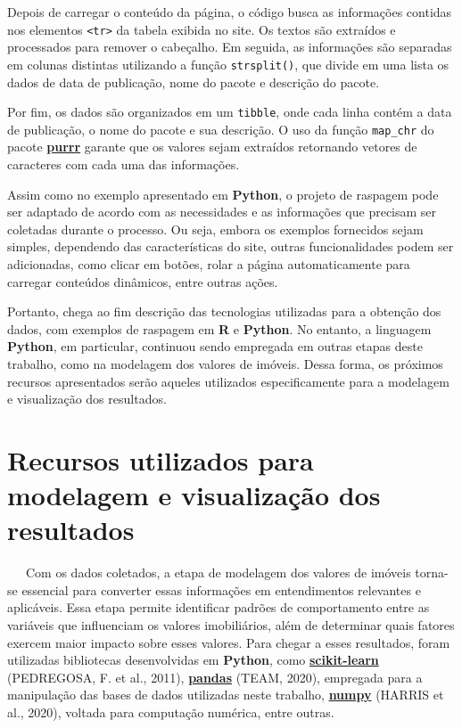 \documentclass[
  12pt,
  a4paper,
]{scrreprt}
\begin{document}
\vspace{12pt}

Depois de carregar o conteúdo da página, o código busca as informações
contidas nos elementos \texttt{\textless{}tr\textgreater{}} da tabela
exibida no site. Os textos são extraídos e processados para remover o
cabeçalho. Em seguida, as informações são separadas em colunas distintas
utilizando a função \texttt{strsplit()}, que divide em uma lista os
dados de data de publicação, nome do pacote e descrição do pacote.

\vspace{12pt}

Por fim, os dados são organizados em um \texttt{tibble}, onde cada linha
contém a data de publicação, o nome do pacote e sua descrição. O uso da
função \texttt{map\_chr} do pacote
\href{https://purrr.tidyverse.org/}{\textbf{purrr}} garante que os
valores sejam extraídos retornando vetores de caracteres com cada uma
das informações.

\vspace{12pt}

Assim como no exemplo apresentado em \textbf{Python}, o projeto de
raspagem pode ser adaptado de acordo com as necessidades e as
informações que precisam ser coletadas durante o processo. Ou seja,
embora os exemplos fornecidos sejam simples, dependendo das
características do site, outras funcionalidades podem ser adicionadas,
como clicar em botões, rolar a página automaticamente para carregar
conteúdos dinâmicos, entre outras ações.

\vspace{12pt}

Portanto, chega ao fim descrição das tecnologias utilizadas para a
obtenção dos dados, com exemplos de raspagem em \textbf{R} e
\textbf{Python}. No entanto, a linguagem \textbf{Python}, em particular,
continuou sendo empregada em outras etapas deste trabalho, como na
modelagem dos valores de imóveis. Dessa forma, os próximos recursos
apresentados serão aqueles utilizados especificamente para a modelagem e
visualização dos resultados.

\section{Recursos utilizados para modelagem e visualização dos
resultados}\label{recursos-utilizados-para-modelagem-e-visualizauxe7uxe3o-dos-resultados}

~~~Com os dados coletados, a etapa de modelagem dos valores de imóveis
torna-se essencial para converter essas informações em entendimentos
relevantes e aplicáveis. Essa etapa permite identificar padrões de
comportamento entre as variáveis que influenciam os valores
imobiliários, além de determinar quais fatores exercem maior impacto
sobre esses valores. Para chegar a esses resultados, foram utilizadas
bibliotecas desenvolvidas em \textbf{Python}, como
\href{https://scikit-learn.org/stable/}{\textbf{scikit-learn}}
(PEDREGOSA, F. et al., 2011),
\href{https://pandas.pydata.org/}{\textbf{pandas}} (TEAM, 2020),
empregada para a manipulação das bases de dados utilizadas neste
trabalho, \href{https://numpy.org/}{\textbf{numpy}} (HARRIS et al.,
2020), voltada para computação numérica, entre outras.
\end{document}
